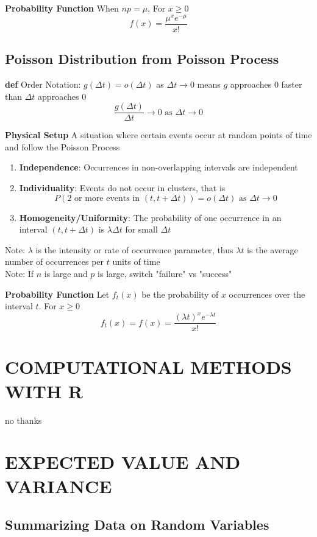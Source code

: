 \documentclass[11pt,notitlepage]{report}
\begin{document}
\textbf{Probability Function} When $np = \mu$, For $x \geq 0$
$$f(x) = \frac{\mu ^x e^{-\mu}}{x!}$$

\newpage
\section{Poisson Distribution from Poisson Process}

\textbf{def} Order Notation: $g(\Delta t) = o(\Delta t)$ as $\Delta t \rightarrow 0$ means $g$ approaches $0$ faster than $\Delta t$ approaches $0$
$$\frac{g(\Delta t)}{\Delta t} \rightarrow 0 \text{ as } \Delta t \rightarrow 0$$

\textbf{Physical Setup} A situation where certain events occur at random points of time and follow the Poisson Process
\begin{enumerate}
    \item \textbf{Independence}: Occurrences in non-overlapping intervals are independent
    \item \textbf{Individuality}: Events do not occur in clusters, that is $$P(\text{2 or more events in }(t, t+\Delta t)) = o(\Delta t) \text{ as } \Delta t \rightarrow 0$$
    \item \textbf{Homogeneity/Uniformity}: The probability of one occurrence in an interval $(t, t+\Delta t)$ is $\lambda \Delta t$ for small $\Delta t$
\end{enumerate}
\hspace*{5mm} Note: $\lambda$ is the intensity or rate of occurrence parameter, thus $\lambda t$ is the average number of occurrences per $t$ units of time\\
\hspace*{5mm} Note: If $n$ is large and $p$ is large, switch "failure" vs "success"

\textbf{Probability Function} Let $f_t(x)$ be the probability of $x$ occurrences over the interval $t$. For $x \geq 0$
$$f_t(x) = f(x) = \frac{(\lambda t)^xe^{-\lambda t}}{x!}$$

\chapter{COMPUTATIONAL METHODS WITH R}
no thanks
\chapter{EXPECTED VALUE AND VARIANCE}
\section{Summarizing Data on Random Variables}
\end{document}
